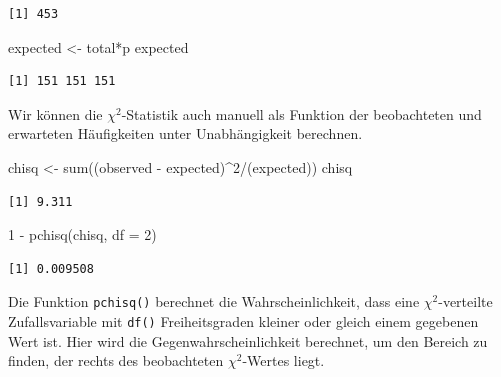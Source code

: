 \documentclass[
  ngerman,
]{scrbook}
\newenvironment{Shaded}{\begin{snugshade}}{\end{snugshade}}
\newcommand{\AttributeTok}[1]{\textcolor[rgb]{0.77,0.63,0.00}{#1}}
\newcommand{\DecValTok}[1]{\textcolor[rgb]{0.00,0.00,0.81}{#1}}
\newcommand{\FunctionTok}[1]{\textcolor[rgb]{0.00,0.00,0.00}{#1}}
\newcommand{\NormalTok}[1]{#1}
\newcommand{\OtherTok}[1]{\textcolor[rgb]{0.56,0.35,0.01}{#1}}
\newcommand{\SpecialCharTok}[1]{\textcolor[rgb]{0.00,0.00,0.00}{#1}}
\newenvironment{note}[1]
  {
  \begin{itemize}
  \renewcommand{\labelitemi}{
    \raisebox{-.01\height}[0pt][0pt]{
      {\setkeys{Gin}{width=7em,keepaspectratio}
        {\normalsize \textcolor{dark-fom-green}\faHashtag}}
        }
  }
  \begin{blackbox}
   \item
    }
    {
  \end{blackbox}
  \end{itemize}
  }
\begin{document}
\begin{verbatim}
[1] 453
\end{verbatim}

\begin{Shaded}
\begin{Highlighting}[]
\NormalTok{expected }\OtherTok{\textless{}{-}}\NormalTok{ total}\SpecialCharTok{*}\NormalTok{p}
\NormalTok{expected}
\end{Highlighting}
\end{Shaded}

\begin{verbatim}
[1] 151 151 151
\end{verbatim}

Wir können die \(\chi^2\)-Statistik auch manuell als Funktion der beobachteten und erwarteten Häufigkeiten unter Unabhängigkeit berechnen.

\begin{Shaded}
\begin{Highlighting}[]
\NormalTok{chisq }\OtherTok{\textless{}{-}} \FunctionTok{sum}\NormalTok{((observed }\SpecialCharTok{{-}}\NormalTok{ expected)}\SpecialCharTok{\^{}}\DecValTok{2}\SpecialCharTok{/}\NormalTok{(expected))}
\NormalTok{chisq}
\end{Highlighting}
\end{Shaded}

\begin{verbatim}
[1] 9.311
\end{verbatim}

\begin{Shaded}
\begin{Highlighting}[]
\DecValTok{1} \SpecialCharTok{{-}} \FunctionTok{pchisq}\NormalTok{(chisq, }\AttributeTok{df =} \DecValTok{2}\NormalTok{)}
\end{Highlighting}
\end{Shaded}

\begin{verbatim}
[1] 0.009508
\end{verbatim}

\begin{note}{note}
Die Funktion \texttt{pchisq()} berechnet die Wahrscheinlichkeit, dass eine \(\chi^2\)-verteilte Zufallsvariable mit \texttt{df()} Freiheitsgraden kleiner oder gleich einem gegebenen Wert ist. Hier wird die Gegenwahrscheinlichkeit berechnet, um den Bereich zu finden, der rechts des beobachteten \(\chi^2\)-Wertes liegt.

\end{note}
\end{document}
